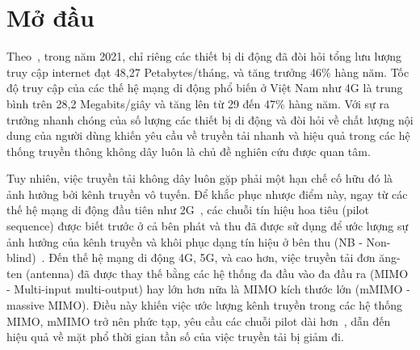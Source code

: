 \clearpage
{}

\chapter*{Mở đầu}

Theo~\cite{Mtawa2019}, trong năm 2021, chỉ riêng các thiết bị di động đã đòi hỏi tổng lưu lượng truy cập internet đạt 48,27 Petabytes/tháng, và tăng trưởng 46\% hàng năm. Tốc độ truy cập của các thế hệ mạng di động phổ biến ở Việt Nam như 4G là trung bình trên 28,2 Megabits/giây và tăng lên từ 29 đến 47\% hàng năm. Với sự ra trưởng nhanh chóng của số lượng các thiết bị di động và đòi hỏi về chất lượng nội dung của người dùng khiến yêu cầu về truyền tải nhanh và hiệu quả trong các hệ thống truyền thông không dây luôn là chủ đề nghiên cứu được quan tâm.

Tuy nhiên, việc truyền tải không dây luôn gặp phải một hạn chế cố hữu đó là ảnh hưởng bởi kênh truyền vô tuyến. Để khắc phục nhược điểm này, ngay từ các thế hệ mạng di động đầu tiên như 2G~\cite{Tse2005}, các chuỗi tín hiệu hoa tiêu (pilot sequence) được biết trước ở cả bên phát và thu đã được sử dụng để ước lượng sự ảnh hưởng của kênh truyền và khôi phục dạng tín hiệu ở bên thu (NB - Non-blind)~\cite{ljung1999system}. Đến thế hệ mạng di động 4G, 5G, và cao hơn, việc truyền tải đơn ăng-ten (antenna) đã được thay thế bằng các hệ thống đa đầu vào đa đầu ra (MIMO - Multi-input multi-output) hay lớn hơn nữa là MIMO kích thước lớn (mMIMO - massive MIMO). Điều này khiến việc ước lượng kênh truyền trong các hệ thống MIMO, mMIMO trở nên phức tạp, yêu cầu các chuỗi pilot dài hơn~\cite{Michelusi2009}, dẫn đến hiệu quả về mặt phổ thời gian tần số của việc truyền tải bị giảm đi. 

